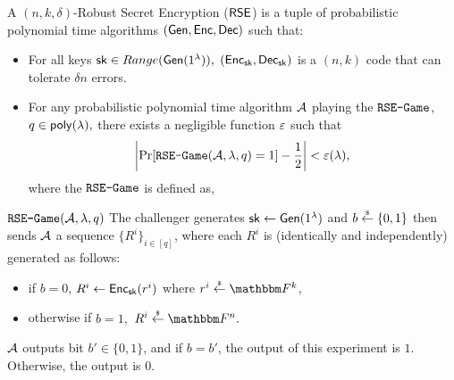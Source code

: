 \begin{definition}\label{def:RSE}
    A $(n,k,\delta)$-Robust Secret Encryption ($\mathsf{RSE}$) is a tuple of probabilistic polynomial time algorithms $(\mathsf{Gen},\mathsf{Enc},\mathsf{Dec})$ such that:
    \begin{itemize}
        \item For all keys $\mathsf{sk} \in Range(\mathsf{Gen}(1^\lambda)),$ $(\mathsf{Enc}_{\mathsf{sk}},\mathsf{Dec}_{\mathsf{sk}})$ is a $(n,k)$ code that can tolerate $\delta n$ errors.
        \item For any probabilistic polynomial time algorithm $\mathcal{A}$ playing the $\texttt{RSE-Game}$, $q \in \mathsf{poly}(\lambda),$ there exists a negligible function $\varepsilon$ such that 
        \[\left| \Pr[\texttt{RSE-Game}(\mathcal{A},\lambda,q) = 1] - \frac{1}{2} \right| < \varepsilon(\lambda),\]
        where the $\texttt{RSE-Game}$ is defined as,
    \end{itemize}
    \begin{weirdFrame}{$\texttt{RSE-Game}(\mathcal{A},\lambda,q)$}
    The challenger generates $\mathsf{sk} \leftarrow \mathsf{Gen}(1^\lambda)$ and $b \overset{{\scriptscriptstyle\$}}{\leftarrow} \{0,1\}$ then sends $\mathcal{A}$ a sequence $\{R^i\}_{i \in [q]}$, where each $R^i$ is (identically and independently) generated as follows:
    \begin{itemize}
    \item if $b = 0$, $R^i \leftarrow \mathsf{Enc}_{\mathsf{sk}}(r^i)$ where $r^i \unif \F^k$,
    \item otherwise if $b = 1,$ $R^i \unif \F^n.$
    \end{itemize}
    $\mathcal{A}$ outputs bit $b' \in \{0,1\}$, and if $b = b'$, the output of this experiment is $1$.
    Otherwise, the output is $0.$
    \end{weirdFrame}
\end{definition}